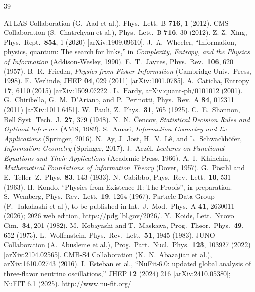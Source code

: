 \documentclass[12pt,a4paper]{article}
\begin{document}
\begin{thebibliography}{39}
\setlength{\itemsep}{1pt}
\setlength{\parskip}{0pt}

 ATLAS Collaboration (G.~Aad et al.),
  Phys.\ Lett.\ B \textbf{716}, 1 (2012).
 CMS Collaboration (S.~Chatrchyan et al.),
  Phys.\ Lett.\ B \textbf{716}, 30 (2012).
 Z.-Z.~Xing, Phys.\ Rept.\ \textbf{854}, 1 (2020) [arXiv:1909.09610].
 J.~A.~Wheeler, ``Information, physics, quantum:
  The search for links,'' in \textit{Complexity, Entropy, and the
  Physics of Information} (Addison-Wesley, 1990).
 E.~T.~Jaynes, Phys.\ Rev.\ \textbf{106}, 620 (1957).
 B.~R.~Frieden, \textit{Physics from Fisher Information}
  (Cambridge Univ.\ Press, 1998).
 E.~Verlinde, JHEP \textbf{04}, 029 (2011)
  [arXiv:1001.0785].
 A.~Caticha, Entropy \textbf{17}, 6110 (2015)
  [arXiv:1509.03222].
 L.~Hardy, arXiv:quant-ph/0101012 (2001).
 G.~Chiribella, G.~M.~D'Ariano, and P.~Perinotti,
  Phys.\ Rev.\ A \textbf{84}, 012311 (2011) [arXiv:1011.6451].
 W.~Pauli, Z.\ Phys.\ \textbf{31}, 765 (1925).
 C.~E.~Shannon, Bell Syst.\ Tech.\ J.\ \textbf{27}, 379 (1948).
 N.~N.~\v{C}encov, \textit{Statistical Decision Rules
  and Optimal Inference} (AMS, 1982).
 S.~Amari, \textit{Information Geometry and Its Applications}
  (Springer, 2016).
 N.~Ay, J.~Jost, H.~V.~L\^e, and L.~Schwachh\"ofer,
  \textit{Information Geometry} (Springer, 2017).
 J.~Acz\'el, \textit{Lectures on Functional Equations and Their Applications}
  (Academic Press, 1966).
 A.~I.~Khinchin, \textit{Mathematical Foundations of
  Information Theory} (Dover, 1957).
 G.~P\"oschl and E.~Teller,
  Z.\ Phys.\ \textbf{83}, 143 (1933).
 N.~Cabibbo, Phys.\ Rev.\ Lett.\ \textbf{10}, 531 (1963).
 H.~Kondo, ``Physics from Existence II: The Proofs'', in preparation.
 S.~Weinberg, Phys.\ Rev.\ Lett.\ \textbf{19}, 1264 (1967).
 Particle Data Group (F.~Takahashi et al.), to be published in
  Int.\ J.\ Mod.\ Phys.\ A \textbf{41}, 2630011 (2026);
  2026 web edition, \url{https://pdg.lbl.gov/2026/}.
 Y.~Koide, Lett.\ Nuovo Cim.\ \textbf{34}, 201 (1982).
 M.~Kobayashi and T.~Maskawa,
  Prog.\ Theor.\ Phys.\ \textbf{49}, 652 (1973).
 L.~Wolfenstein, Phys.\ Rev.\ Lett.\ \textbf{51}, 1945 (1983).
 JUNO Collaboration (A.~Abusleme et al.),
  Prog.\ Part.\ Nucl.\ Phys.\ \textbf{123}, 103927 (2022) [arXiv:2104.02565].
 CMB-S4 Collaboration (K.~N.~Abazajian et al.),
  arXiv:1610.02743 (2016).
 I.~Esteban et al.,   ``NuFit-6.0: updated global analysis of three-flavor neutrino oscillations,''   JHEP \textbf{12} (2024) 216   [arXiv:2410.05380]; NuFIT 6.1 (2025). \url{http://www.nu-fit.org/}


\end{thebibliography}
\end{document}
